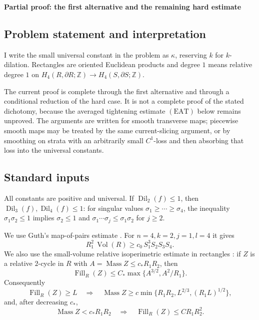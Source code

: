 \documentclass[12pt]{article}
\newcommand{\Dil}{\operatorname{Dil}}
\newcommand{\Vol}{\operatorname{Vol}}
\newcommand{\Mass}{\operatorname{Mass}}
\newcommand{\Fill}{\operatorname{Fill}}
\begin{document}

\date{}


\begin{center}
{\bf Partial proof: the first alternative and the remaining hard estimate}
\end{center}

\subsection*{Problem statement and interpretation}

I write the small universal constant in the problem as \(\kappa\), reserving
\(k\) for \(k\)-dilation.  Rectangles are oriented Euclidean products and
degree \(1\) means relative degree \(1\) on
\(H_4(R,\partial R;\mathbb Z)\to H_4(S,\partial S;\mathbb Z)\).

The current proof is complete through the first alternative and through a
conditional reduction of the hard case.  It is not a complete proof of the
stated dichotomy, because the averaged tightening estimate \((\mathrm{EAT})\)
below remains unproved.  The arguments are written for smooth transverse maps;
piecewise smooth maps may be treated by the same current-slicing argument, or
by smoothing on strata with an arbitrarily small \(C^1\)-loss and then
absorbing that loss into the universal constants.

\subsection*{Standard inputs}

All constants are positive and universal.  If \(\Dil_2(f)\le1\), then
\(\Dil_3(f),\Dil_4(f)\le1\): for singular values
\(\sigma_1\ge\cdots\ge\sigma_4\), the inequality
\(\sigma_1\sigma_2\le1\) implies \(\sigma_2\le1\) and
\(\sigma_1\cdots\sigma_j\le\sigma_1\sigma_2\) for \(j\ge2\).

We use Guth's map-of-pairs estimate \cite[Estimate 1]{GuthExpanding}.  For
\(n=4,k=2,j=1,l=4\) it gives
\begin{equation}\label{guth14}
        R_1^2\,\Vol(R)\ge c_0\,S_1^3S_2S_3S_4 .
\end{equation}
We also use the small-volume relative isoperimetric estimate in rectangles
\cite[Theorem 3]{GuthExpanding}: if \(Z\) is a relative \(2\)-cycle in \(R\)
with \(A=\Mass Z\le c_*R_1R_2\), then
\[
        \Fill_R(Z)\le C_*\max\{A^{3/2},A^2/R_1\}.
\]
Consequently
\begin{equation}\label{profile-inverse}
\Fill_R(Z)\ge L\quad\Longrightarrow\quad
\Mass Z\ge c\min\{R_1R_2,L^{2/3},(R_1L)^{1/2}\},
\end{equation}
and, after decreasing \(c_*\),
\begin{equation}\label{iso}
        \Mass Z<c_*R_1R_2\quad\Longrightarrow\quad
        \Fill_R(Z)\le C R_1R_2^2 .
\end{equation}
\end{document}
